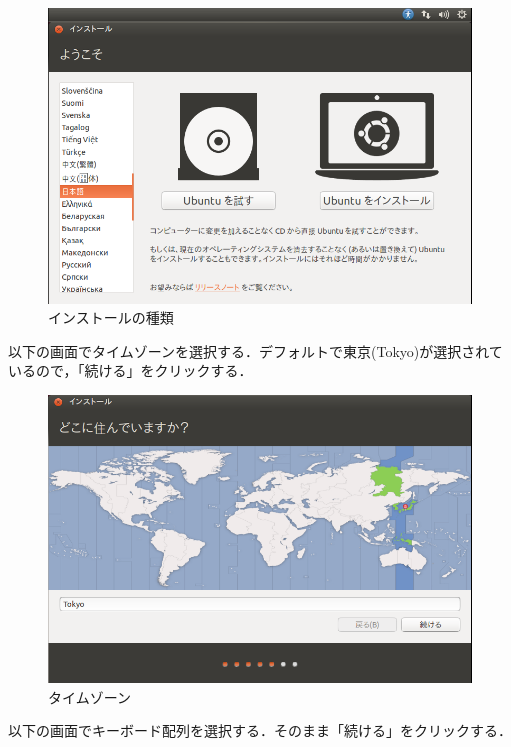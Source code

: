 \begin{figure}[htb]
\centering
\includegraphics[width=15cm]{ubuntuinstall3.png}
\caption{インストールの種類}\label{インストール準備画面2}
\end{figure}

以下の画面でタイムゾーンを選択する．デフォルトで東京(Tokyo)が選択されているので，「続ける」をクリックする．

\begin{figure}[htb]
\centering
\includegraphics[width=15cm]{ubuntuinstall4.png}
\caption{タイムゾーン}\label{タイムゾーン}
\end{figure}


以下の画面でキーボード配列を選択する．そのまま「続ける」をクリックする．

